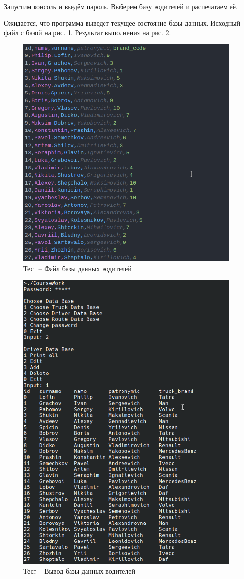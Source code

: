 
Запустим консоль и введём пароль. 
Выберем базу водителей и распечатаем её.

Ожидается, что программа выведет текущее состояние базы данных.
Исходный файл с базой на рис. \ref{driver_db_state_init}.
Результат выполнения на рис. \ref{driver_db_print}.

\begin{figure}[H]
	\centering
	\includegraphics[width=0.7\linewidth]{photo/tests/admin/driver_db_state_init}
	\caption{Тест -- Файл базы данных водителей}
	\label{driver_db_state_init}
\end{figure}

\begin{figure}[H]
	\centering
	\includegraphics[width=0.7\linewidth]{photo/tests/admin/driver_db_print}
	\caption{Тест -- Вывод базы данных водителей}
	\label{driver_db_print}
\end{figure}

